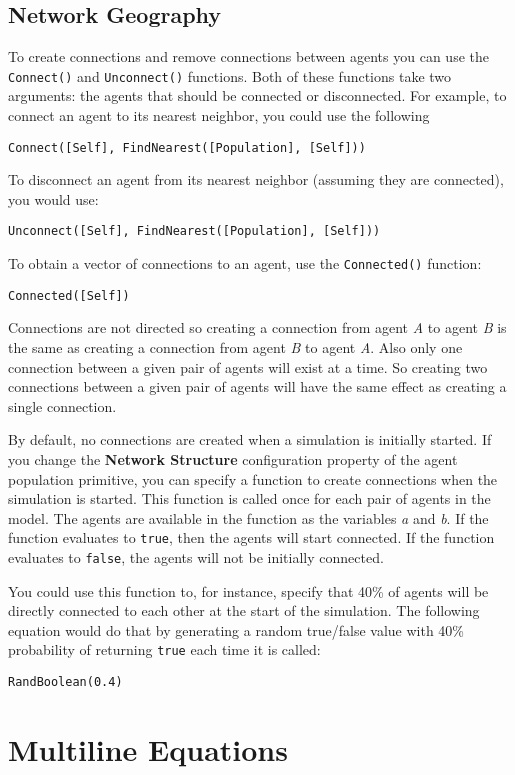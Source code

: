 \documentclass[]{memoir}
\renewcommand{\a}[1]{\textbf{#1}}
\begin{document}
\subsection{Network Geography}

To create connections and remove connections between agents you can use
the \lstinline!Connect()! and \lstinline!Unconnect()! functions. Both of
these functions take two arguments: the agents that should be connected
or disconnected. For example, to connect an agent to its nearest
neighbor, you could use the following

\lstinline!Connect([Self], FindNearest([Population], [Self]))!

To disconnect an agent from its nearest neighbor (assuming they are
connected), you would use:

\lstinline!Unconnect([Self], FindNearest([Population], [Self]))!

To obtain a vector of connections to an agent, use the
\lstinline!Connected()! function:

\lstinline!Connected([Self])!

Connections are not directed so creating a connection from agent
\emph{A} to agent \emph{B} is the same as creating a connection from
agent \emph{B} to agent \emph{A}. Also only one connection between a
given pair of agents will exist at a time. So creating two connections
between a given pair of agents will have the same effect as creating a
single connection.

By default, no connections are created when a simulation is initially
started. If you change the \a{Network Structure} configuration property
of the agent population primitive, you can specify a function to create
connections when the simulation is started. This function is called once
for each pair of agents in the model. The agents are available in the
function as the variables \emph{a} and \emph{b}. If the function
evaluates to \lstinline!true!, then the agents will start connected. If
the function evaluates to \lstinline!false!, the agents will not be
initially connected.

You could use this function to, for instance, specify that 40\% of
agents will be directly connected to each other at the start of the
simulation. The following equation would do that by generating a random
true/false value with 40\% probability of returning \lstinline!true!
each time it is called:

\lstinline!RandBoolean(0.4)!

\section{Multiline Equations}
\end{document}
